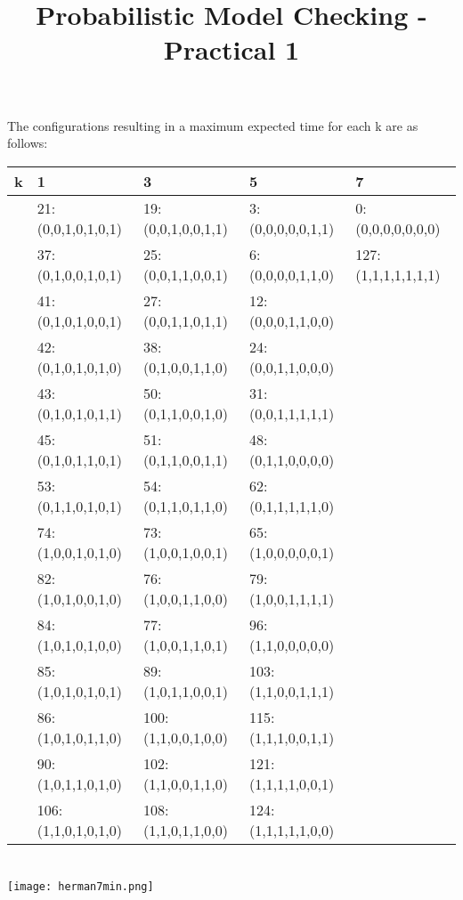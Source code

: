 \documentclass[12pt]{article}
\title{Probabilistic Model Checking - Practical 1}
\date{}
\begin{document}
\maketitle

\section {}

The configurations resulting in a maximum expected time for each k are as follows:
\begin{table}[!htb]
\begin{tabular}{l|l|l|l|l}
	k & 1 & 3 & 5 & 7 \\ \hline
	& 21:(0,0,1,0,1,0,1) & 19:(0,0,1,0,0,1,1) & 3:(0,0,0,0,0,1,1) & 0: (0,0,0,0,0,0,0) \\
	& 37:(0,1,0,0,1,0,1) & 25:(0,0,1,1,0,0,1) & 6:(0,0,0,0,1,1,0) & 127: (1,1,1,1,1,1,1) \\
	& 41:(0,1,0,1,0,0,1) & 27:(0,0,1,1,0,1,1) & 12:(0,0,0,1,1,0,0) \\
	& 42:(0,1,0,1,0,1,0) & 38:(0,1,0,0,1,1,0) & 24:(0,0,1,1,0,0,0) \\
	& 43:(0,1,0,1,0,1,1) & 50:(0,1,1,0,0,1,0) & 31:(0,0,1,1,1,1,1) \\
	& 45:(0,1,0,1,1,0,1) & 51:(0,1,1,0,0,1,1) & 48:(0,1,1,0,0,0,0) \\
	& 53:(0,1,1,0,1,0,1) & 54:(0,1,1,0,1,1,0) & 62:(0,1,1,1,1,1,0) \\
	& 74:(1,0,0,1,0,1,0) & 73:(1,0,0,1,0,0,1) & 65:(1,0,0,0,0,0,1) \\
	& 82:(1,0,1,0,0,1,0) & 76:(1,0,0,1,1,0,0) & 79:(1,0,0,1,1,1,1) \\
	& 84:(1,0,1,0,1,0,0) & 77:(1,0,0,1,1,0,1) & 96:(1,1,0,0,0,0,0) \\
	& 85:(1,0,1,0,1,0,1) & 89:(1,0,1,1,0,0,1) & 103:(1,1,0,0,1,1,1) \\
	& 86:(1,0,1,0,1,1,0) & 100:(1,1,0,0,1,0,0) & 115:(1,1,1,0,0,1,1) \\
	& 90:(1,0,1,1,0,1,0) & 102:(1,1,0,0,1,1,0) & 121:(1,1,1,1,0,0,1) \\
	& 106:(1,1,0,1,0,1,0) & 108:(1,1,0,1,1,0,0) & 124:(1,1,1,1,1,0,0) \\
\end{tabular}
\end{table}
\clearpage
\section {}



\texttt{[image: herman7min.png]}

\endsection
\end{document}
